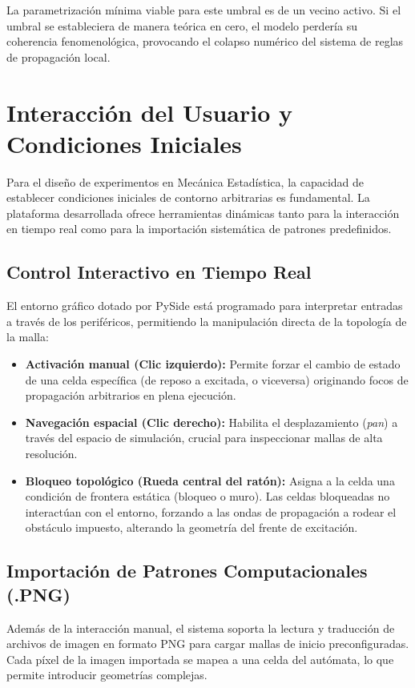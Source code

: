 \documentclass[12pt,a4paper]{article}
\begin{document}
La parametrización mínima viable para este umbral es de un vecino activo. Si el umbral se estableciera de manera teórica en cero, el modelo perdería su coherencia fenomenológica, provocando el colapso numérico del sistema de reglas de propagación local.

\section{Interacción del Usuario y Condiciones Iniciales}

Para el diseño de experimentos en Mecánica Estadística, la capacidad de establecer condiciones iniciales de contorno arbitrarias es fundamental. La plataforma desarrollada ofrece herramientas dinámicas tanto para la interacción en tiempo real como para la importación sistemática de patrones predefinidos.

\subsection{Control Interactivo en Tiempo Real}
El entorno gráfico dotado por PySide está programado para interpretar entradas a través de los periféricos, permitiendo la manipulación directa de la topología de la malla:
\begin{itemize}
    \item \textbf{Activación manual (Clic izquierdo):} Permite forzar el cambio de estado de una celda específica (de reposo a excitada, o viceversa) originando focos de propagación arbitrarios en plena ejecución.
    \item \textbf{Navegación espacial (Clic derecho):} Habilita el desplazamiento (\textit{pan}) a través del espacio de simulación, crucial para inspeccionar mallas de alta resolución.
    \item \textbf{Bloqueo topológico (Rueda central del ratón):} Asigna a la celda una condición de frontera estática (bloqueo o muro). Las celdas bloqueadas no interactúan con el entorno, forzando a las ondas de propagación a rodear el obstáculo impuesto, alterando la geometría del frente de excitación.
\end{itemize}

\subsection{Importación de Patrones Computacionales (.PNG)}
Además de la interacción manual, el sistema soporta la lectura y traducción de archivos de imagen en formato PNG para cargar mallas de inicio preconfiguradas. Cada píxel de la imagen importada se mapea a una celda del autómata, lo que permite introducir geometrías complejas. 
\end{document}
